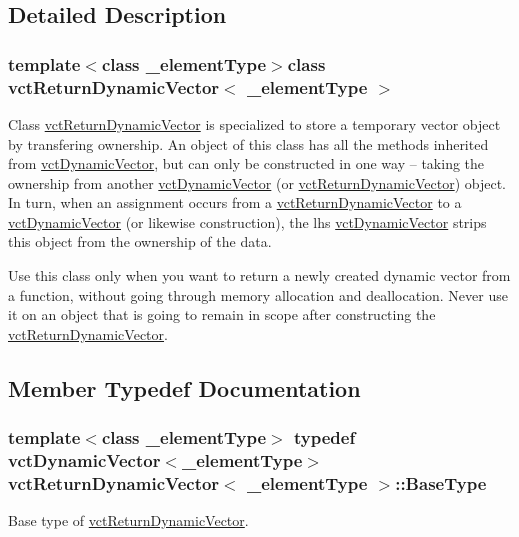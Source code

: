 \subsection{Detailed Description}
\subsubsection*{template$<$class \-\_\-element\-Type$>$class vct\-Return\-Dynamic\-Vector$<$ \-\_\-element\-Type $>$}

Class \hyperlink{classvct_return_dynamic_vector}{vct\-Return\-Dynamic\-Vector} is specialized to store a temporary vector object by transfering ownership. An object of this class has all the methods inherited from \hyperlink{classvct_dynamic_vector}{vct\-Dynamic\-Vector}, but can only be constructed in one way -- taking the ownership from another \hyperlink{classvct_dynamic_vector}{vct\-Dynamic\-Vector} (or \hyperlink{classvct_return_dynamic_vector}{vct\-Return\-Dynamic\-Vector}) object. In turn, when an assignment occurs from a \hyperlink{classvct_return_dynamic_vector}{vct\-Return\-Dynamic\-Vector} to a \hyperlink{classvct_dynamic_vector}{vct\-Dynamic\-Vector} (or likewise construction), the lhs \hyperlink{classvct_dynamic_vector}{vct\-Dynamic\-Vector} strips this object from the ownership of the data.

Use this class only when you want to return a newly created dynamic vector from a function, without going through memory allocation and deallocation. Never use it on an object that is going to remain in scope after constructing the \hyperlink{classvct_return_dynamic_vector}{vct\-Return\-Dynamic\-Vector}. 

\subsection{Member Typedef Documentation}
\hypertarget{classvct_return_dynamic_vector_aec5f994308da32f15af397a1f89ca23d}{
\subsubsection[{Base\-Type}]{\setlength{\rightskip}{0pt plus 5cm}template$<$class \-\_\-element\-Type$>$ typedef {\bf vct\-Dynamic\-Vector}$<$\-\_\-element\-Type$>$ {\bf vct\-Return\-Dynamic\-Vector}$<$ \-\_\-element\-Type $>$\-::{\bf Base\-Type}}}\label{classvct_return_dynamic_vector_aec5f994308da32f15af397a1f89ca23d}
Base type of \hyperlink{classvct_return_dynamic_vector}{vct\-Return\-Dynamic\-Vector}. 

